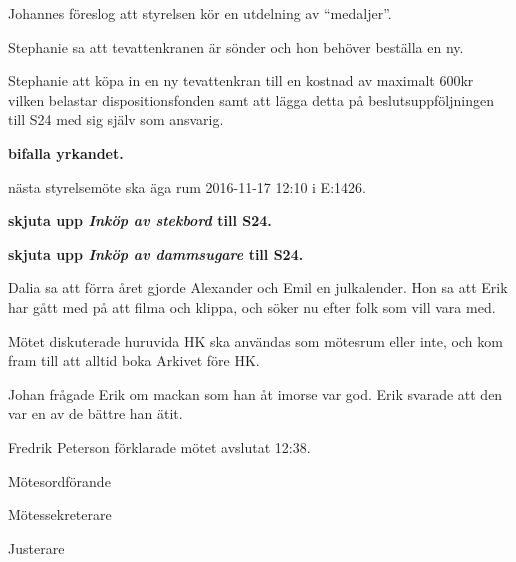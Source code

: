 \documentclass[10pt]{article}
\def\mo{Fredrik Peterson}
\def\ms{Erik Månsson}
\def\ji{Malin Lindström}
\begin{document}
\begin{paragrafer}
Johannes föreslog att styrelsen kör en utdelning av ``medaljer''.

Stephanie sa att tevattenkranen är sönder och hon behöver beställa en ny.

Stephanie \ypa att köpa in en ny tevattenkran till en kostnad av maximalt 600kr vilken belastar dispositionsfonden samt att lägga detta på beslutsuppföljningen till S24 med sig själv som ansvarig.

\textbf{\Mba bifalla yrkandet.}

\Mba nästa styrelsemöte ska äga rum 2016-11-17 12:10 i E:1426.

\textbf{\Mba skjuta upp \emph{Inköp av stekbord} till S24.}

\textbf{\Mba skjuta upp \emph{Inköp av dammsugare} till S24.}

Dalia sa att förra året gjorde Alexander och Emil en julkalender. Hon sa att Erik har gått med på att filma och klippa, och söker nu efter folk som vill vara med.

Mötet diskuterade huruvida HK ska användas som mötesrum eller inte, och kom fram till att alltid boka Arkivet före HK.

Johan frågade Erik om mackan som han åt imorse var god. Erik svarade att den var en av de bättre han ätit.

{\mo} förklarade mötet avslutat 12:38.

\end{paragrafer}

\newpage
\hidesignfoot
\begin{signatures}{3}
\signature{\mo}{Mötesordförande}
\signature{\ms}{Mötessekreterare}
\signature{\ji}{Justerare}
\end{signatures}
\end{document}
